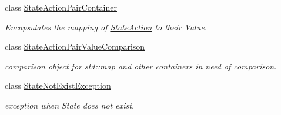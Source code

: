 \begin{DoxyCompactItemize}
class \hyperlink{classAI_1_1StateActionPairContainer}{State\-Action\-Pair\-Container}
\begin{DoxyCompactList}\small\item\em Encapsulates the mapping of \hyperlink{classAI_1_1StateAction}{State\-Action} to their Value. \end{DoxyCompactList}\item 
class \hyperlink{classAI_1_1StateActionPairValueComparison}{State\-Action\-Pair\-Value\-Comparison}
\begin{DoxyCompactList}\small\item\em comparison object for std\-::map and other containers in need of comparison. \end{DoxyCompactList}\item 
class \hyperlink{classAI_1_1StateNotExistException}{State\-Not\-Exist\-Exception}
\begin{DoxyCompactList}\small\item\em exception when State does not exist. \end{DoxyCompactList}\end{DoxyCompactItemize}
